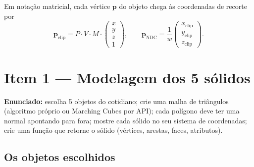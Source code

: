 \documentclass[11pt,a4paper]{article}
\newcommand{\novasecao}{\clearpage}
\newcommand{\vetor}[1]{\mathbf{#1}}
\begin{document}
Em notação matricial, cada vértice $\vetor p$ do objeto chega às coordenadas de recorte por
\[
\vetor p_{\text{clip}} = P \cdot V \cdot M \cdot
\begin{pmatrix} x \\ y \\ z \\ 1 \end{pmatrix},
\qquad
\vetor p_{\text{NDC}} = \frac{1}{w}\begin{pmatrix} x_{\text{clip}} \\ y_{\text{clip}} \\ z_{\text{clip}} \end{pmatrix}.
\]

\novasecao
\section{Item 1 — Modelagem dos 5 sólidos}

\begin{enunciado}
\textbf{Enunciado:} escolha 5 objetos do cotidiano; crie uma malha de triângulos (algoritmo próprio
ou Marching Cubes por API); cada polígono deve ter uma normal apontando para fora; mostre cada sólido
no seu sistema de coordenadas; crie uma função que retorne o sólido (vértices, arestas, faces,
atributos).
\end{enunciado}

\subsection{Os objetos escolhidos}
\end{document}
